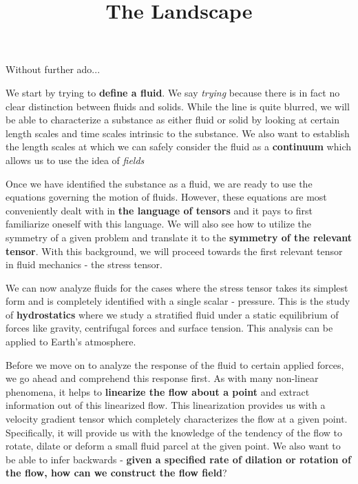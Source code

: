 \documentclass[11pt,a4paper]{article}
\title{The Landscape}
\begin{document}
\maketitle

Without further ado...

We start by trying to \textbf{define a fluid}. We say \textit{trying} because there is in fact no clear distinction between fluids and solids. While the line is quite blurred, we will be able to characterize a substance as either fluid or solid by looking at certain length scales and time scales intrinsic to the substance. We also want to establish the length scales at which we can safely consider the fluid as a \textbf{continuum} which allows us to use the idea of \textit{fields}

\hfill

Once we have identified the substance as a fluid, we are ready to use the equations governing the motion of fluids. However, these equations are most conveniently dealt with in \textbf{the language of tensors} and it pays to first familiarize oneself with this language. We will also see how to utilize the symmetry of a given problem and translate it to the \textbf{symmetry of the relevant tensor}. With this background, we will proceed towards the first relevant tensor in fluid mechanics - the stress tensor.

\hfill

We can now analyze fluids for the cases where the stress tensor takes its simplest form and is completely identified with a single scalar - pressure. This is the study of \textbf{hydrostatics} where we study a stratified fluid under a static equilibrium of forces like gravity, centrifugal forces and surface tension. This analysis can be applied to Earth's atmosphere.

\hfill

Before we move on to analyze the response of the fluid to certain applied forces, we go ahead and comprehend this response first. As with many non-linear phenomena, it helps to \textbf{linearize the flow about a point} and extract information out of this linearized flow. This linearization provides us with a velocity gradient tensor which completely characterizes the flow at a given point. Specifically, it will provide us with the knowledge of the tendency of the flow to rotate, dilate or deform a small fluid parcel at the given point. We also want to be able to infer backwards - \textbf{given a specified rate of dilation or rotation of the flow, how can we construct the flow field}? 
\end{document}
